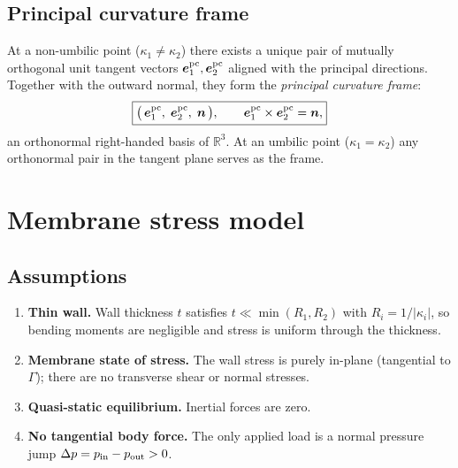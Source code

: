 \documentclass[11pt]{article}
\newcommand{\vv}[1]{\bm{#1}}          %
\newcommand{\nn}{\vv{n}}               %
\newcommand{\kone}{\kappa_1}
\newcommand{\ktwo}{\kappa_2}
\newcommand{\R}{\mathbb{R}}
\begin{document}
\subsection{Principal curvature frame}
\label{sec:frame}

At a non-umbilic point ($\kone\ne\ktwo$) there exists a unique pair of mutually
orthogonal unit tangent vectors $\vv{e}_1^{\rm pc},\vv{e}_2^{\rm pc}$ aligned
with the principal directions.  Together with the outward normal, they form the
\emph{principal curvature frame}:
\begin{equation}
  \boxed{%
  \bigl(\,\vv{e}_1^{\rm pc},\;\vv{e}_2^{\rm pc},\;\nn\,\bigr),
  \qquad
  \vv{e}_1^{\rm pc}\times\vv{e}_2^{\rm pc}=\nn,
  }
  \label{eq:pc-frame}
\end{equation}
an orthonormal right-handed basis of $\R^3$.  At an umbilic point
($\kone=\ktwo$) any orthonormal pair in the tangent plane serves as the frame.

\section{Membrane stress model}
\label{sec:model}

\subsection{Assumptions}

\begin{enumerate}[label=(\roman*)]
  \item \textbf{Thin wall.}  Wall thickness $t$ satisfies
        $t\ll\min(R_1,R_2)$ with $R_i=1/|\kappa_i|$, so bending moments are
        negligible and stress is uniform through the thickness.
  \item \textbf{Membrane state of stress.}  The wall stress is purely in-plane
        (tangential to $\Gamma$); there are no transverse shear or normal
        stresses.
  \item \textbf{Quasi-static equilibrium.}  Inertial forces are zero.
  \item \textbf{No tangential body force.}  The only applied load is a
        normal pressure jump $\Delta p = p_{\rm in}-p_{\rm out}>0$.
\end{enumerate}
\end{document}
